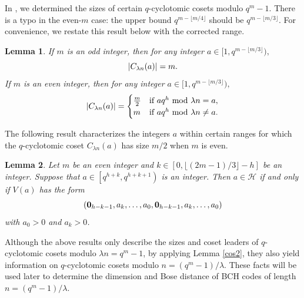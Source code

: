 \documentclass[journal,onecolumn]{IEEEtran}
\newtheorem{lemma}{Lemma}
\begin{document}
In \cite[Theorem 1]{zheng2025}, we determined the sizes of certain
$q$-cyclotomic cosets modulo $q^{m}-1$. 
There is a typo in the even-$m$ case:
the upper bound $q^{m-\lfloor m/4\rfloor}$ should be 
$q^{m-\lfloor m/3\rfloor}$. 
For  convenience, we restate this result below with the
corrected range.
 
\begin{lemma}\textnormal{\cite[Theorem 1]{zheng2025}}\label{th1}
If  $m$ is an  odd integer,  then for  any integer $a\in [1,q^{m-\lfloor {m}/{3}\rfloor}),$
\begin{equation}\notag
|C_{\lambda n}(a)|=m. 
\end{equation}
If   $m$ is an even integer,  then  for any integer  $a\in  [1,q^{m-\lfloor{m}/{3}\rfloor}),$ 
\begin{equation*}
|C_{\lambda n}(a)|=\begin{cases}
\frac{m}{2} & \hbox{if }  aq^{h}\mathrm{\ mod\ } \lambda n = a, \\
m & \hbox{if } aq^{h} \mathrm{\ mod\ }\lambda n \neq  a. 
\end{cases}
\end{equation*}
\label{th2e}
\end{lemma} 


The following result characterizes the integers $a$ within certain ranges for which the $q$-cyclotomic coset $C_{\lambda n}(a)$ has size $m/2$  when $m$ is even.
\begin{lemma}\textnormal{\cite[Corollary 2]{zheng2025}}\label{corr}
Let $m$ be an even integer and  $k\in \left[0,\lfloor(2m-1)/{3}\rfloor-h\right]$ be an integer. Suppose that $ a\in  \left[q^{h+k},q^{h+k+1}\right)$   is  an integer. Then   $a\in \mathcal{H}$ if and only if $V(a)$ has the form 
\begin{equation}\notag
(\mathbf{0}_{h-k-1},a_{k},\ldots,a_0, \mathbf{0}_{h-k-1},a_{k},\ldots,a_0)
\end{equation}
with  $a_0>0$ and $a_k>0$.   
\end{lemma}

Although the above results only describe the sizes and coset leaders of
$q$-cyclotomic cosets modulo $\lambda n = q^{m}-1$, by applying Lemma \ref{cos2}, they also yield information on
$q$-cyclotomic cosets modulo
$
n=(q^{m}-1)/\lambda.
$
These facts will be used later to determine the dimension and Bose distance of BCH codes of length $n=(q^{m}-1)/\lambda$.
\end{document}
